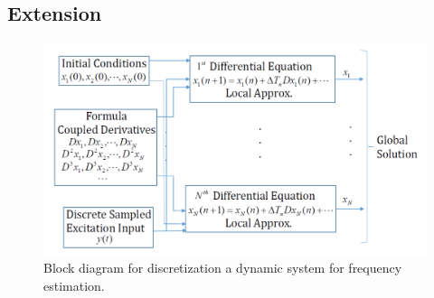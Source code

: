 \documentclass{UCF_ETD}
\begin{document}


\subsection{Extension} \label{extension.subsection}

\begin{figure}[H]
\begin{center}
\includegraphics[scale=0.6]{NonuniformANF/ODESolverInDiscreteTime}
\caption{Block diagram for discretization a dynamic system for frequency estimation.}
\label{ODESolverInDiscreteTime.fig}
\end{center}
\end{figure}
\end{document}
